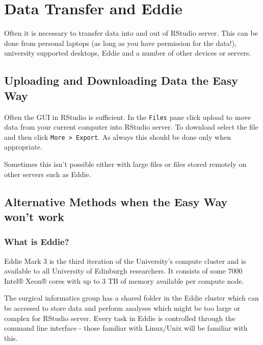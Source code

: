 \documentclass[]{book}
\theoremstyle{definition}
\theoremstyle{definition}
\theoremstyle{definition}
\theoremstyle{remark}
\begin{document}
\hypertarget{data-transfer-and-eddie}{%
\chapter{Data Transfer and Eddie}\label{data-transfer-and-eddie}}

Often it is necessary to transfer data into and out of RStudio server.
This can be done from personal laptops (as long as you have permission
for the data!), university supported desktops, Eddie and a number of
other devices or servers.

\hypertarget{uploading-and-downloading-data-the-easy-way}{%
\section{Uploading and Downloading Data the Easy
Way}\label{uploading-and-downloading-data-the-easy-way}}

Often the GUI in RStudio is sufficient. In the \texttt{Files} pane click
upload to move data from your current computer into RStudio server. To
download select the file and then click
\texttt{More\ \textgreater{}\ Export}. As always this should be done
only when appropriate.

Sometimes this isn't possible either with large files or files stored
remotely on other servers such as Eddie.

\hypertarget{alternative-methods-when-the-easy-way-wont-work}{%
\section{Alternative Methods when the Easy Way won't
work}\label{alternative-methods-when-the-easy-way-wont-work}}

\hypertarget{what-is-eddie}{%
\subsection{What is Eddie?}\label{what-is-eddie}}

Eddie Mark 3 is the third iteration of the University's compute cluster
and is available to all University of Edinburgh researchers. It consists
of some 7000 Intel® Xeon® cores with up to 3 TB of memory available per
compute node.

The surgical informatics group has a shared folder in the Eddie cluster
which can be accessed to store data and perform analyses which might be
too large or complex for RStudio server. Every task in Eddie is
controlled through the command line interface - those familiar with
Linux/Unix will be familiar with this.
\end{document}
